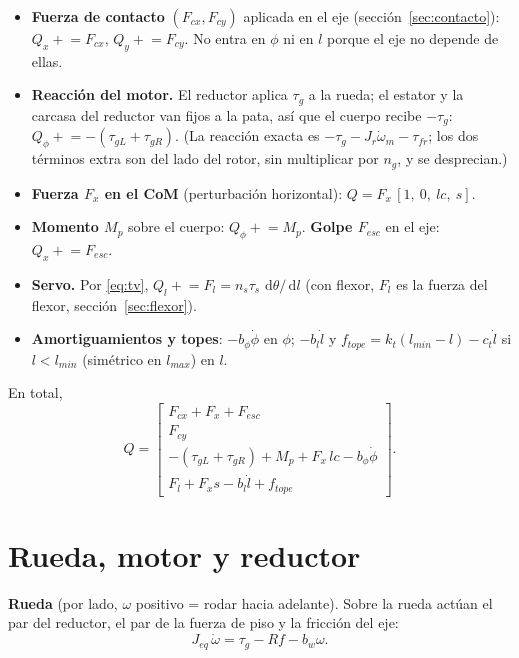 \documentclass[11pt,a4paper]{article}
\newcommand{\dd}{\,\mathrm{d}}
\begin{document}
\begin{itemize}\itemsep3pt
  \item \textbf{Fuerza de contacto} $(F_{cx}, F_{cy})$ aplicada en el eje (sección~\ref{sec:contacto}):
  $Q_x \mathrel{+}= F_{cx}$, $Q_y \mathrel{+}= F_{cy}$. No entra en $\phi$ ni en $l$ porque el eje no depende de ellas.
  \item \textbf{Reacción del motor.} El reductor aplica $\tau_g$ a la rueda; el estator y la carcasa del
  reductor van fijos a la pata, así que el cuerpo recibe $-\tau_g$: $Q_\phi \mathrel{+}= -(\tau_{gL} + \tau_{gR})$.
  (La reacción exacta es $-\tau_g - J_r\dot\omega_m - \tau_{fr}$; los dos términos extra son del lado del
  rotor, sin multiplicar por $n_g$, y se desprecian.)
  \item \textbf{Fuerza $F_x$ en el CoM} (perturbación horizontal): $Q = F_x\,[1,\ 0,\ l c,\ s]$.
  \item \textbf{Momento $M_p$} sobre el cuerpo: $Q_\phi \mathrel{+}= M_p$. \textbf{Golpe $F_{esc}$} en el eje: $Q_x \mathrel{+}= F_{esc}$.
  \item \textbf{Servo.} Por \eqref{eq:tv}, $Q_l \mathrel{+}= F_l = n_s\tau_s\,\dd\theta/\dd l$ (con flexor, $F_l$ es la
  fuerza del flexor, sección~\ref{sec:flexor}).
  \item \textbf{Amortiguamientos y topes}: $-b_\phi\dot\phi$ en $\phi$; $-b_l\dot l$ y
  $f_{tope} = k_t(l_{min} - l) - c_t\dot l$ si $l < l_{min}$ (simétrico en $l_{max}$) en $l$.
\end{itemize}
En total,
\begin{equation}
  Q = \begin{bmatrix} F_{cx} + F_x + F_{esc} \\ F_{cy} \\ -(\tau_{gL} + \tau_{gR}) + M_p + F_x\, l c - b_\phi\dot\phi \\ F_l + F_x s - b_l\dot l + f_{tope} \end{bmatrix}.
  \label{eq:Q}
\end{equation}

\section{Rueda, motor y reductor}
\label{sec:motor}

\textbf{Rueda} (por lado, $\omega$ positivo = rodar hacia adelante). Sobre la rueda actúan el par del
reductor, el par de la fuerza de piso y la fricción del eje:
\begin{equation}
  J_{eq}\,\dot\omega = \tau_g - R f - b_w\omega .
  \label{eq:rueda}
\end{equation}
\end{document}
